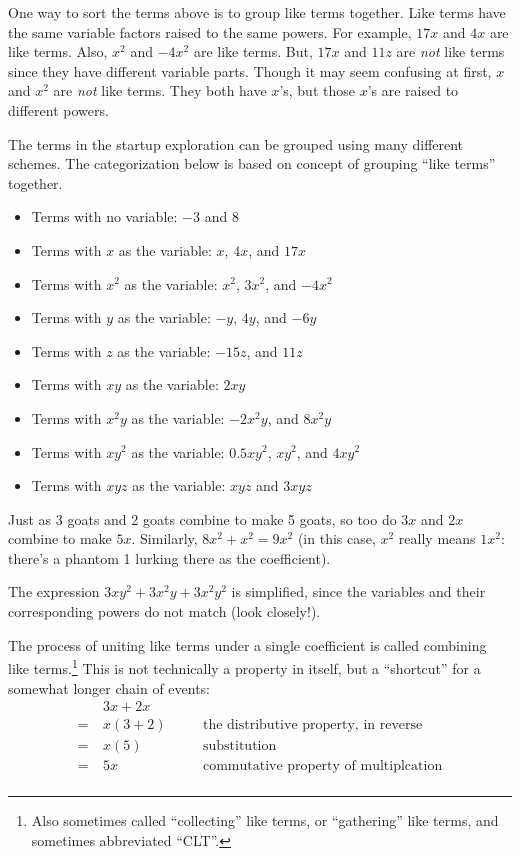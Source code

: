 One way to sort the terms above is to group \gls{like terms} together. Like terms have the same variable factors raised to the same powers. For example, $17x$ and $4x$ are like terms. Also, $x^2$ and $-4x^2$ are like terms. But, $17x$ and $11z$ are \textit{not} like terms since they have different variable parts. Though it may seem confusing at first, $x$ and $x^2$ are \textit{not} like terms. They both have $x$'s, but those $x$'s are raised to different powers.

\begin{boxex}
The terms in the startup exploration can be grouped using many different schemes. The categorization below is based on concept of grouping ``like terms'' together.
\begin{itemize}
	\item Terms with no variable: $-3$ and $8$
	\item Terms with $x$ as the variable: $x$, $4x$, and $17x$
	\item Terms with $x^2$ as the variable: $x^2$, $3x^2$, and $-4x^2$
	\item Terms with $y$ as the variable: $-y$, $4y$, and $-6y$
	\item Terms with $z$ as the variable: $-15z$, and $11z$
	\item Terms with $xy$ as the variable: $2xy$
	\item Terms with $x^2y$ as the variable: $-2x^2y$, and $8x^2y$
	\item Terms with $xy^2$ as the variable: $0.5xy^2$, $xy^2$, and $4xy^2$
	\item Terms with $xyz$ as the variable: $xyz$ and $3xyz$
\end{itemize}

\end{boxex}

Just as 3 goats and 2 goats combine to make 5 goats, so too do $3x$ and $2x$ combine to make $5x$. Similarly, $8x^2 + x^2 = 9x^2$ (in this case, $x^2$ really means $1x^2$: there's a phantom 1 lurking there as the coefficient).

The expression $3xy^2 + 3x^2y + 3x^2y^2$ is simplified, since the variables and their corresponding powers do not match (look closely!).

The process of uniting like terms under a single coefficient is called \gls{combining like terms}.\footnote{Also sometimes called ``collecting'' like terms, or ``gathering'' like terms, and sometimes abbreviated ``CLT''.} This is not technically a property in itself, but a ``shortcut'' for a somewhat longer chain of events:
\[\begin{aligned}
	&~ 3x + 2x\\
=	&~ x(3 + 2)
&& \quad \text{the distributive property, in reverse}\\
=	&~ x(5)
&& \quad \text{substitution}\\
=	&~ 5x
&& \quad \text{commutative property of multiplcation}\\
\end{aligned}\]

